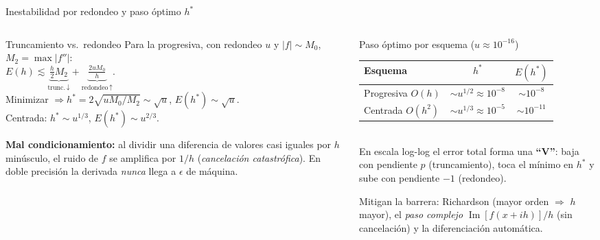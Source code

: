\documentclass[aspectratio=169,10pt]{beamer}
\begin{document}
\begin{frame}{Inestabilidad por redondeo y paso óptimo $h^*$}
\begin{columns}[T]
\begin{column}{0.50\textwidth}
\begin{cardidea}{Truncamiento vs.\ redondeo}{\faSuperscript}
{\footnotesize Para la progresiva, con redondeo $u$ y $|f|\sim M_0$, $M_2=\max|f''|$:\\[0.6mm]
$E(h)\lesssim\underbrace{\tfrac{h}{2}M_2}_{\text{trunc.}\,\downarrow}+\underbrace{\tfrac{2uM_0}{h}}_{\text{redondeo}\,\uparrow}$.\\[1.0mm]
Minimizar $\Rightarrow h^*=2\sqrt{uM_0/M_2}\sim\sqrt{u}$, $E(h^*)\sim\sqrt{u}$.\\[0.6mm]
Centrada: $h^*\sim u^{1/3}$, $E(h^*)\sim u^{2/3}$.}
\end{cardidea}
\vspace{1mm}
\begin{cardnota}[\faExclamationTriangle]
{\footnotesize \textbf{Mal condicionamiento:} al dividir una diferencia de valores casi iguales por $h$ minúsculo, el ruido de $f$ se amplifica por $1/h$ (\emph{cancelación catastrófica}). En doble precisión la derivada \emph{nunca} llega a $\epsilon$ de máquina.}
\end{cardnota}
\end{column}
\begin{column}{0.48\textwidth}
\begin{cardgear}{Paso óptimo por esquema ($u\approx10^{-16}$)}{\faTable}
\centering
{\footnotesize\renewcommand{\arraystretch}{1.35}\setlength{\tabcolsep}{5pt}
\begin{tabular}{l|c|c}
Esquema & $h^*$ & $E(h^*)$\\\hline
Progresiva $O(h)$ & $\sim u^{1/2}{\approx}10^{-8}$ & $\sim10^{-8}$\\
Centrada $O(h^2)$ & $\sim u^{1/3}{\approx}10^{-5}$ & $\sim10^{-11}$\\
\end{tabular}}\\[1.4mm]
{\footnotesize En escala log-log el error total forma una \textbf{``V''}: baja con pendiente $p$ (truncamiento), toca el mínimo en $h^*$ y sube con pendiente $-1$ (redondeo).}
\end{cardgear}
\vspace{1mm}
\begin{cardnota}[\faInfoCircle]
{\footnotesize Mitigan la barrera: Richardson (mayor orden $\Rightarrow$ $h$ mayor), el \emph{paso complejo} $\operatorname{Im}[f(x{+}ih)]/h$ (sin cancelación) y la diferenciación automática.}
\end{cardnota}
\end{column}
\end{columns}
\end{frame}
\end{document}
